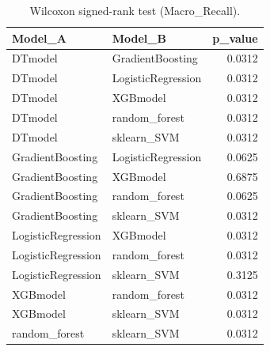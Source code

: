 \begin{table}[t]
\centering
\begin{tabular}{llr}
\toprule
Model_A & Model_B & p_value \\
\midrule
DTmodel & GradientBoosting & 0.0312 \\
DTmodel & LogisticRegression & 0.0312 \\
DTmodel & XGBmodel & 0.0312 \\
DTmodel & random_forest & 0.0312 \\
DTmodel & sklearn_SVM & 0.0312 \\
GradientBoosting & LogisticRegression & 0.0625 \\
GradientBoosting & XGBmodel & 0.6875 \\
GradientBoosting & random_forest & 0.0625 \\
GradientBoosting & sklearn_SVM & 0.0312 \\
LogisticRegression & XGBmodel & 0.0312 \\
LogisticRegression & random_forest & 0.0312 \\
LogisticRegression & sklearn_SVM & 0.3125 \\
XGBmodel & random_forest & 0.0312 \\
XGBmodel & sklearn_SVM & 0.0312 \\
random_forest & sklearn_SVM & 0.0312 \\
\bottomrule
\end{tabular}
\caption{Wilcoxon signed-rank test (Macro_Recall).}
\label{tab:wilcoxon_Macro_Recall}
\end{table}